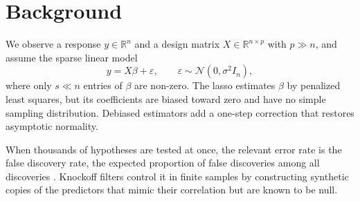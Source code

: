 \chapter{Background}
\label{ch:background}

We observe a response $y \in \mathbb{R}^n$ and a design matrix $X \in \mathbb{R}^{n\times p}$
with $p \gg n$, and assume the sparse linear model
\begin{equation}
  y = X\beta + \varepsilon, \qquad \varepsilon \sim \mathcal{N}(0, \sigma^2 I_n),
  \label{eq:model}
\end{equation}
where only $s \ll n$ entries of $\beta$ are non-zero. The lasso \citep{tibshirani1996}
estimates $\beta$ by penalized least squares, but its coefficients are biased toward zero and
have no simple sampling distribution. Debiased estimators \citep{vandegeer2014,
javanmard2014} add a one-step correction that restores asymptotic normality.

When thousands of hypotheses are tested at once, the relevant error rate is the false
discovery rate, the expected proportion of false discoveries among all discoveries
\citep{benjamini1995}. Knockoff filters \citep{barber2015} control it in finite samples by
constructing synthetic copies of the predictors that mimic their correlation but are known to
be null.
